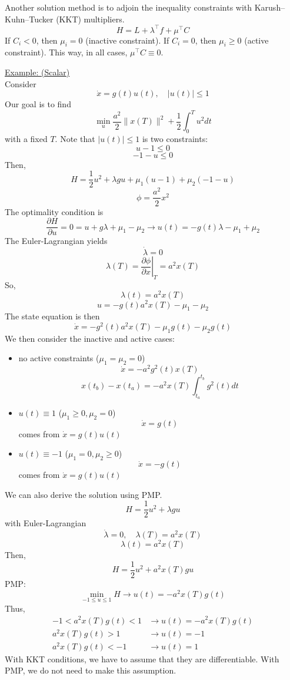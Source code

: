 \documentclass{article}
\begin{document}
\noindent
Another solution method is to adjoin the inequality constraints with Karush–Kuhn–Tucker (KKT)
multipliers.
\[H = L + \lambda^\top f + \mu^\top C\]
If $C_i < 0$, then $\mu_i = 0$ (inactive constraint).
If $C_i = 0$, then $\mu_i \ge 0$ (active constraint).
This way, in all cases, $\mu^\top C \equiv 0$.

\noindent
\underline{Example: (Scalar)}\\[2mm]
Consider
\[\dot{x} = g(t)u(t), \quad |u(t)| \le 1\]
Our goal is to find
\[\min_{u}\frac{a^2}{2}\|x(T)\|^2 + \frac{1}{2}\int_{0}^{T}u^2 dt\]
with a fixed $T$. Note that $|u(t)| \le 1$ is two constraints:
\[u-1 \le 0\]
\[-1-u \le 0\]
Then,
\[H = \frac{1}{2}u^2 + \lambda gu + \mu_1(u-1) + \mu_2(-1-u)\]
\[\phi = \frac{a^2}{2}x^2\]
The optimality condition is
\[\frac{\partial H}{\partial u} = 0 = u + g\lambda + \mu_1 - \mu_2 \rightarrow
u(t) = -g(t)\lambda - \mu_1 + \mu_2\]
The Euler-Lagrangian yields
\[\dot{\lambda} = 0\]
\[\lambda(T) = \left.\frac{\partial\phi}{\partial x}\right|_{T} = a^2 x(T)\]
So,
\[\lambda(t) = a^2 x(T)\]
\[u = -g(t)a^2 x(T) - \mu_1 - \mu_2\]
The state equation is then
\[\dot{x} = -g^2(t)a^2 x(T) - \mu_1g(t) - \mu_2g(t)\]
We then consider the inactive and active cases:
\begin{itemize}
    \item no active constraints ($\mu_1 = \mu_2 = 0$)
    \[\dot{x} = -a^2 g^2(t)x(T)\]
    \[x(t_b) - x(t_a) = -a^2x(T)\int_{t_a}^{t_b}g^2(t)dt\]
    \item $u(t) \equiv 1$ ($\mu_1 \ge 0, \mu_2 = 0$)
    \[\dot{x} = g(t)\]
    comes from $\dot{x} = g(t)u(t)$
    \item $u(t) \equiv -1$ ($\mu_1 = 0, \mu_2 \ge 0$)
    \[\dot{x} = -g(t)\]
    comes from $\dot{x} = g(t)u(t)$
\end{itemize}
We can also derive the solution using PMP.
\[H = \frac{1}{2}u^2 + \lambda gu\]
with Euler-Lagrangian
\[\dot{\lambda} = 0, \quad \lambda(T) = a^2x(T)\]
\[\lambda(t) = a^2x(T)\]
Then,
\[H = \frac{1}{2}u^2 + a^2x(T)gu\]
PMP:
\[\min_{-1 \le u \le 1}H \rightarrow u(t) = -a^2x(T)g(t)\]
Thus,
\begin{align*}
    -1 < a^2x(T)g(t) < 1 &\rightarrow u(t) = -a^2x(T)g(t) \\
    a^2x(T)g(t) > 1 &\rightarrow u(t) = -1 \\
    a^2x(T)g(t) < -1 &\rightarrow u(t) = 1
\end{align*}
With KKT conditions, we have to assume that they are differentiable. With PMP,
we do not need to make this assumption.
\end{document}
